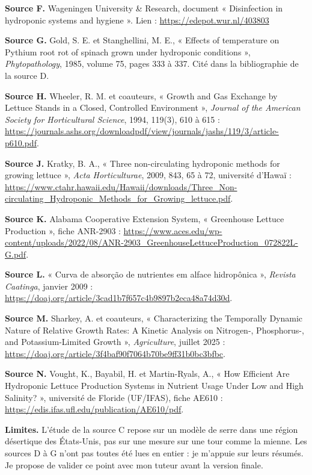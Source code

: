 \textbf{Source F.} Wageningen University \& Research, document « Disinfection in hydroponic systems and hygiene ». Lien : \url{https://edepot.wur.nl/403803}

\textbf{Source G.} Gold, S. E. et Stanghellini, M. E., « Effects of temperature on Pythium root rot of spinach grown under hydroponic conditions », \emph{Phytopathology}, 1985, volume 75, pages 333 à 337. Cité dans la bibliographie de la source D.

\textbf{Source H.} Wheeler, R. M. et coauteurs, « Growth and Gas Exchange by Lettuce Stands in a Closed, Controlled Environment », \emph{Journal of the American Society for Horticultural Science}, 1994, 119(3), 610 à 615 : \textcolor{blue}{\url{https://journals.ashs.org/downloadpdf/view/journals/jashs/119/3/article-p610.pdf}}.

\textbf{Source J.} Kratky, B. A., « Three non-circulating hydroponic methods for growing lettuce », \emph{Acta Horticulturae}, 2009, 843, 65 à 72, université d'Hawaï : \textcolor{blue}{\url{https://www.ctahr.hawaii.edu/Hawaii/downloads/Three_Non-circulating_Hydroponic_Methods_for_Growing_lettuce.pdf}}.

\textbf{Source K.} Alabama Cooperative Extension System, « Greenhouse Lettuce Production », fiche ANR-2903 : \textcolor{blue}{\url{https://www.aces.edu/wp-content/uploads/2022/08/ANR-2903_GreenhouseLettuceProduction_072822L-G.pdf}}.

\textbf{Source L.} « Curva de absorção de nutrientes em alface hidropônica », \emph{Revista Caatinga}, janvier 2009 : \textcolor{blue}{\url{https://doaj.org/article/3cad1b7f657c4b9897b2eca48a74d30d}}.

\textbf{Source M.} Sharkey, A. et coauteurs, « Characterizing the Temporally Dynamic Nature of Relative Growth Rates: A Kinetic Analysis on Nitrogen-, Phosphorus-, and Potassium-Limited Growth », \emph{Agriculture}, juillet 2025 : \textcolor{blue}{\url{https://doaj.org/article/3f4baf90f7064b70be9ff31b0bc3bfbc}}.

\textbf{Source N.} Vought, K., Bayabil, H. et Martin-Ryals, A., « How Efficient Are Hydroponic Lettuce Production Systems in Nutrient Usage Under Low and High Salinity? », université de Floride (UF/IFAS), fiche AE610 : \textcolor{blue}{\url{https://edis.ifas.ufl.edu/publication/AE610/pdf}}.

\textbf{Limites.} L'étude de la source C repose sur un modèle de serre dans une région désertique des États-Unis, pas sur une mesure sur une tour comme la mienne. Les sources D à G n'ont pas toutes été lues en entier : je m'appuie sur leurs résumés. Je propose de valider ce point avec mon tuteur avant la version finale.
